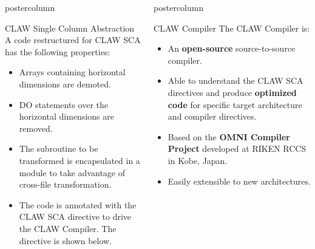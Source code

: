 \documentclass{beamer}
\newlength{\columnheight}
\begin{document}
\begin{frame}
\begin{columns}
\begin{column}{.43\textwidth}
\begin{beamercolorbox}[center]{postercolumn}
\begin{minipage}{.98\textwidth}
{\begin{myblock}{CLAW Single Column Abstraction}
A code restructured for CLAW SCA has the following properties:
\begin{itemize}
  \item Arrays containing horizontal dimensions are demoted.
  \item DO statements over the horizontal dimensions are removed.
  \item The subroutine to be transformed is encapsulated in a module to take
        advantage of cross-file transformation.
  \item The code is annotated with the CLAW SCA directive to drive the CLAW
        Compiler. The directive is shown below.
\end{itemize}

\clawa

\end{myblock}\vfill

}\end{minipage}\end{beamercolorbox}
\end{column}

%
%
\begin{column}{.57\textwidth}
\begin{beamercolorbox}[center]{postercolumn}
\begin{minipage}{.98\textwidth} %
\parbox[t][\columnheight]{\textwidth}{ %

%
%
\begin{myblock}{CLAW Compiler}
The CLAW Compiler is:
\begin{itemize}
  \item An \textbf{open-source} source-to-source compiler.
  \item Able to understand the CLAW SCA directives and produce \textbf{optimized
        code} for specific target architecture and compiler directives.
  \item Based on the \textbf{OMNI Compiler Project}\cite{Omni} developed at
        RIKEN RCCS in Kobe, Japan.
  \item Easily extensible to new architectures.
\end{itemize}

\begin{figure}
\end{figure}
\end{myblock}}
\end{minipage}
\end{beamercolorbox}
\end{column}
\end{columns}
\end{frame}
\end{document}
